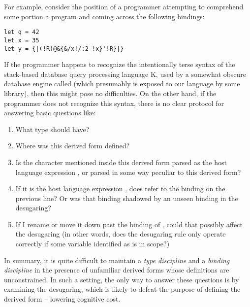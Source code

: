 For example, consider the position of a programmer attempting to comprehend some portion a program and coming across the following bindings:

\begin{lstlisting}[numbers=none]
let q = 42
let x = 35
let y = {|(!R)@&{&/x!/:2_!x}'!R}|}
\end{lstlisting}

If the programmer happens to recognize the intentionally terse syntax of the stack-based database query processing language K, used by a somewhat obscure database engine called  (which presumably is exposed to our language by some library), then this might pose no difficulties. On the other hand, if the programmer does not recognize this syntax, there is no clear protocol for answering basic questions like:

\begin{enumerate}
\item What type should  have?
\item Where was this derived form defined?
\item Is the character  mentioned inside this derived form parsed as the host language expression , or parsed in some way peculiar to this derived form?
\item If it is the host language expression , does  refer to the binding on the previous line? Or was that binding shadowed by an unseen binding in the desugaring?
\item If I rename  or move it down past the binding of , could that possibly affect the desugaring (in other words, does the desugaring rule only operate correctly if  some variable identified as  is in scope?)
\end{enumerate}

In summary, it is quite difficult to maintain a \emph{type discipline} and a \emph{binding discipline} in the presence of unfamiliar derived forms whose definitions are unconstrained. In such a setting, the only way to answer these questions is by examining the desugaring, which is likely to defeat the purpose of defining the derived form -- lowering cognitive cost. 


